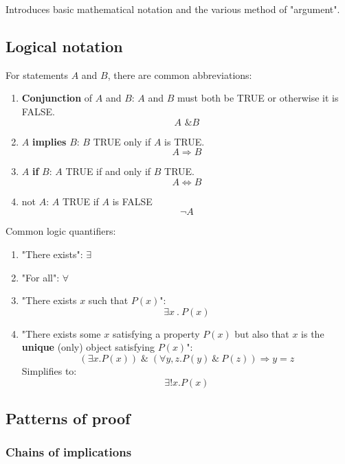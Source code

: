 \documentclass[10pt,a4paper]{article}
\begin{document}
Introduces basic mathematical notation and the various method of "argument". 

\subsection{Logical notation}

For statements $A$ and $B$, there are common abbreviations:
\begin{enumerate}
    \item \textbf{Conjunction} of $A$ and $B$: $A$ and $B$ must both be TRUE or otherwise it is FALSE.
    $$
        A \textbf{ \& } B
    $$
    \item $A$ \textbf{implies} $B$: $B$ TRUE only if $A$ is TRUE.
    $$
        A \Rightarrow B
    $$
    \item $A$ \textbf{if} $B$: $A$ TRUE if and only if $B$ TRUE.
    $$
        A\Longleftrightarrow B
    $$
    \item not $A$: $A$ TRUE if $A$ is FALSE
    $$
        \neg A
    $$
\end{enumerate}

Common logic quantifiers:
\begin{enumerate}
    \item "There exists": $\exists$
    \item "For all": $\forall$
    \item "There exists $x$ such that $P(x)$":
    $$
        \exists x\:.\:P(x)
    $$
    \item "There exists some $x$ satisfying a property $P(x)$ but also that $x$ is the
    \textbf{unique} (only) object satisfying $P(x)$":
    $$
        (\exists x.P(x))\; \& \; (\forall y,z.P(y) \: \& \: P(z))\Rightarrow y = z
    $$
    Simplifies to:
    $$
        \exists !x.P(x)
    $$
\end{enumerate}

\subsection{Patterns of proof}
\subsubsection{Chains of implications}
\end{document}
